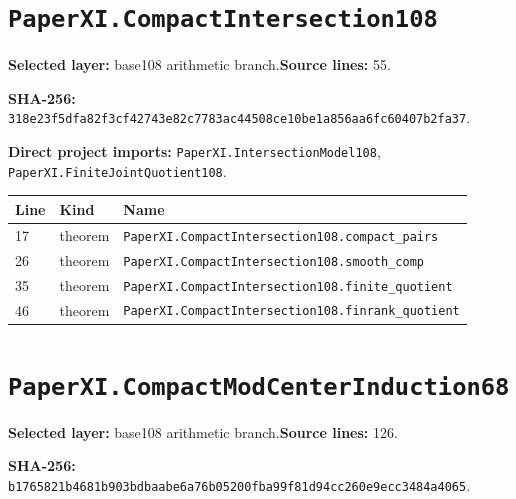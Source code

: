 \documentclass[10pt,oneside]{book}
\begin{document}
\section{\texorpdfstring{\nolinkurl{PaperXI.CompactIntersection108}}{PaperXI.CompactIntersection108}}\label{module:PaperXI.CompactIntersection108}

\textbf{Selected layer:} base108 arithmetic branch.\quad\textbf{Source lines:} 55.\par\textbf{SHA-256:} {\scriptsize\nolinkurl{318e23f5dfa82f3cf42743e82c7783ac44508ce10be1a856aa6fc60407b2fa37}}.


\textbf{Direct project imports:} \nolinkurl{PaperXI.IntersectionModel108}, \nolinkurl{PaperXI.FiniteJointQuotient108}.

\begin{longtable}{@{}p{}p{}p{}@{}}\toprule Line&Kind&Name\\\midrule\endhead

17&theorem&\nolinkurl{PaperXI.CompactIntersection108.compact_pairs}\\

26&theorem&\nolinkurl{PaperXI.CompactIntersection108.smooth_comp}\\

35&theorem&\nolinkurl{PaperXI.CompactIntersection108.finite_quotient}\\

46&theorem&\nolinkurl{PaperXI.CompactIntersection108.finrank_quotient}\\

\bottomrule\end{longtable}

\section{\texorpdfstring{\nolinkurl{PaperXI.CompactModCenterInduction68}}{PaperXI.CompactModCenterInduction68}}\label{module:PaperXI.CompactModCenterInduction68}

\textbf{Selected layer:} base108 arithmetic branch.\quad\textbf{Source lines:} 126.\par\textbf{SHA-256:} {\scriptsize\nolinkurl{b1765821b4681b903bdbaabe6a76b05200fba99f81d94cc260e9ecc3484a4065}}.

\end{document}
